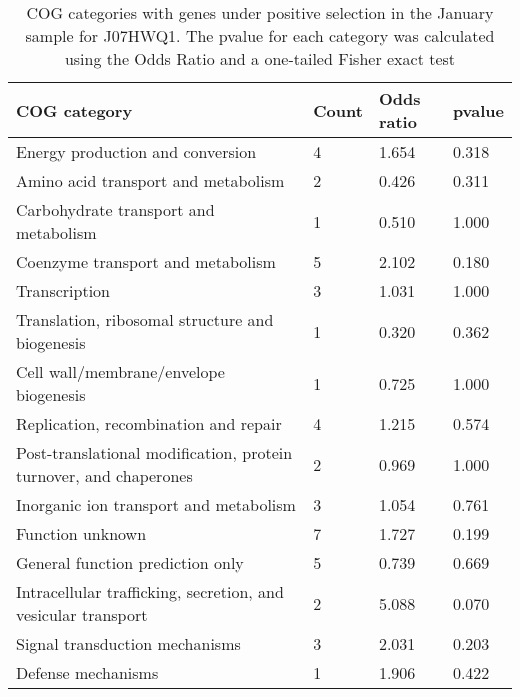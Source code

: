 \begin{table}[]
\footnotesize 
	\tabcolsep=0.11cm 
\caption{COG categories with genes under positive selection in the January sample for J07HWQ1. The pvalue for each category was calculated using the Odds Ratio and a one-tailed Fisher exact test \\} 
\begin{tabularx}{\textwidth}{L{6cm}R{2cm}R{2cm}R{2cm}} 
\hline 
\textbf{COG category} & \textbf{Count} & \textbf{Odds ratio} & \textbf{pvalue} \\ 
\hline 
Energy production and conversion & 4 & 1.654 & 0.318 \\ 
Amino acid transport and metabolism & 2 & 0.426 & 0.311 \\ 
Carbohydrate transport and metabolism & 1 & 0.510 & 1.000 \\ 
Coenzyme transport and metabolism & 5 & 2.102 & 0.180 \\ 
Transcription & 3 & 1.031 & 1.000 \\ 
Translation, ribosomal structure and biogenesis & 1 & 0.320 & 0.362 \\ 
Cell wall/membrane/envelope biogenesis & 1 & 0.725 & 1.000 \\ 
Replication, recombination and repair & 4 & 1.215 & 0.574 \\ 
Post-translational modification, protein turnover, and chaperones & 2 & 0.969 & 1.000 \\ 
Inorganic ion transport and metabolism & 3 & 1.054 & 0.761 \\ 
Function unknown & 7 & 1.727 & 0.199 \\ 
General function prediction only & 5 & 0.739 & 0.669 \\ 
Intracellular trafficking, secretion, and vesicular transport & 2 & 5.088 & 0.070 \\ 
Signal transduction mechanisms & 3 & 2.031 & 0.203 \\ 
Defense mechanisms & 1 & 1.906 & 0.422 \\ 
\end{tabularx} 
\label{January_COG_Selection_J07HWQ1} 
 \end{table} 

